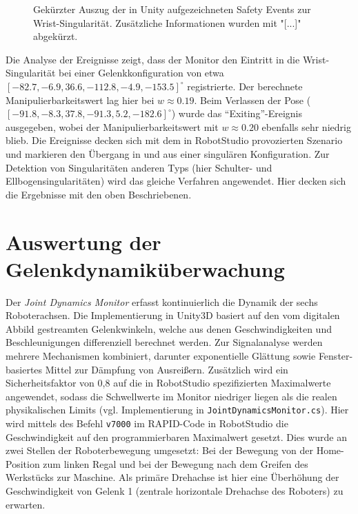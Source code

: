 \begin{figure}[H]
  \inputminted[fontsize=\footnotesize,breaklines]{json}{code-snippets/singularityerror.json}
  \caption{Gekürzter Auszug der in Unity aufgezeichneten Safety
    Events zur Wrist-Singularität. Zusätzliche Informationen wurden mit "[...]"
  abgekürzt.}
  \label{lst:singularity_json}
\end{figure}

Die Analyse der Ereignisse zeigt, dass der Monitor den Eintritt in
die Wrist-Singularität
bei einer Gelenkkonfiguration von etwa
$[-82.7, -6.9, 36.6, -112.8, -4.9, -153.5]^\circ$ registrierte. Der berechnete
Manipulierbarkeitswert lag hier bei $w \approx 0.19$. Beim Verlassen der Pose
($[-91.8, -8.3, 37.8, -91.3, 5.2, -182.6]^\circ$) wurde das
\enquote{Exiting}-Ereignis
ausgegeben, wobei der Manipulierbarkeitswert mit $w \approx 0.20$
ebenfalls sehr niedrig blieb.
Die Ereignisse decken sich mit dem in RobotStudio provozierten
Szenario und markieren den
Übergang in und aus einer singulären Konfiguration.
Zur Detektion von Singularitäten anderen Typs (hier Schulter- und
Ellbogensingularitäten) wird das gleiche Verfahren angewendet. Hier decken sich
die Ergebnisse mit den oben Beschriebenen.

\section{Auswertung der Gelenkdynamiküberwachung}
\label{sec:Analyse_Sicherheit}
Der \textit{Joint Dynamics Monitor} erfasst kontinuierlich die Dynamik der sechs
Roboterachsen. Die Implementierung in Unity3D basiert auf den vom digitalen
Abbild gestreamten Gelenkwinkeln, welche aus denen Geschwindigkeiten und
Beschleunigungen differenziell berechnet werden. Zur Signalanalyse werden
mehrere Mechanismen kombiniert, darunter exponentielle Glättung sowie
Fenster-basiertes Mittel zur Dämpfung von Ausreißern. Zusätzlich wird ein
Sicherheitsfaktor von 0{,}8 auf die in RobotStudio spezifizierten Maximalwerte
angewendet, sodass die Schwellwerte im Monitor niedriger liegen als die realen
physikalischen Limits (vgl. Implementierung in
\texttt{JointDynamicsMonitor.cs}). Hier wird mittels des Befehl \texttt{v7000}
im RAPID-Code in RobotStudio die Geschwindigkeit auf den programmierbaren
Maximalwert gesetzt. Dies wurde an zwei Stellen der Roboterbewegung umgesetzt:
Bei der Bewegung von der Home-Position zum linken Regal und bei der Bewegung
nach dem Greifen des Werkstücks zur Maschine. Als primäre Drehachse ist hier
eine Überhöhung der Geschwindigkeit von Gelenk 1 (zentrale horizontale Drehachse
des Roboters) zu erwarten.

